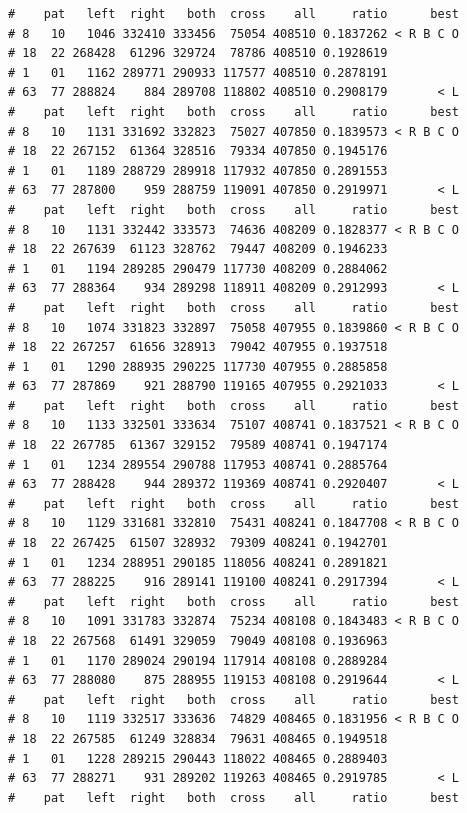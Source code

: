 \documentclass{article}\usepackage[]{graphicx}\usepackage[]{color}
\makeatletter
\newenvironment{kframe}{%
 \def\at@end@of@kframe{}%
 \ifinner\ifhmode%
  \def\at@end@of@kframe{\end{minipage}}%
  \begin{minipage}{\columnwidth}%
 \fi\fi%
 \def\FrameCommand##1{\hskip\@totalleftmargin \hskip-\fboxsep
 \colorbox{shadecolor}{##1}\hskip-\fboxsep
     \hskip-\linewidth \hskip-\@totalleftmargin \hskip\columnwidth}%
 \MakeFramed {\advance\hsize-\width
   \@totalleftmargin\z@ \linewidth\hsize
   \@setminipage}}%
 {\par\unskip\endMakeFramed%
 \at@end@of@kframe}
\newenvironment{knitrout}{}{} %
\makeatother
\begin{document}
\begin{knitrout}
\begin{kframe}
\begin{verbatim}
#    pat   left  right   both  cross    all     ratio      best
# 8   10   1046 332410 333456  75054 408510 0.1837262 < R B C O
# 18  22 268428  61296 329724  78786 408510 0.1928619          
# 1   01   1162 289771 290933 117577 408510 0.2878191          
# 63  77 288824    884 289708 118802 408510 0.2908179       < L
#    pat   left  right   both  cross    all     ratio      best
# 8   10   1131 331692 332823  75027 407850 0.1839573 < R B C O
# 18  22 267152  61364 328516  79334 407850 0.1945176          
# 1   01   1189 288729 289918 117932 407850 0.2891553          
# 63  77 287800    959 288759 119091 407850 0.2919971       < L
#    pat   left  right   both  cross    all     ratio      best
# 8   10   1131 332442 333573  74636 408209 0.1828377 < R B C O
# 18  22 267639  61123 328762  79447 408209 0.1946233          
# 1   01   1194 289285 290479 117730 408209 0.2884062          
# 63  77 288364    934 289298 118911 408209 0.2912993       < L
#    pat   left  right   both  cross    all     ratio      best
# 8   10   1074 331823 332897  75058 407955 0.1839860 < R B C O
# 18  22 267257  61656 328913  79042 407955 0.1937518          
# 1   01   1290 288935 290225 117730 407955 0.2885858          
# 63  77 287869    921 288790 119165 407955 0.2921033       < L
#    pat   left  right   both  cross    all     ratio      best
# 8   10   1133 332501 333634  75107 408741 0.1837521 < R B C O
# 18  22 267785  61367 329152  79589 408741 0.1947174          
# 1   01   1234 289554 290788 117953 408741 0.2885764          
# 63  77 288428    944 289372 119369 408741 0.2920407       < L
#    pat   left  right   both  cross    all     ratio      best
# 8   10   1129 331681 332810  75431 408241 0.1847708 < R B C O
# 18  22 267425  61507 328932  79309 408241 0.1942701          
# 1   01   1234 288951 290185 118056 408241 0.2891821          
# 63  77 288225    916 289141 119100 408241 0.2917394       < L
#    pat   left  right   both  cross    all     ratio      best
# 8   10   1091 331783 332874  75234 408108 0.1843483 < R B C O
# 18  22 267568  61491 329059  79049 408108 0.1936963          
# 1   01   1170 289024 290194 117914 408108 0.2889284          
# 63  77 288080    875 288955 119153 408108 0.2919644       < L
#    pat   left  right   both  cross    all     ratio      best
# 8   10   1119 332517 333636  74829 408465 0.1831956 < R B C O
# 18  22 267585  61249 328834  79631 408465 0.1949518          
# 1   01   1228 289215 290443 118022 408465 0.2889403          
# 63  77 288271    931 289202 119263 408465 0.2919785       < L
#    pat   left  right   both  cross    all     ratio      best

\end{verbatim}
\end{kframe}
\end{knitrout}
\end{document}
